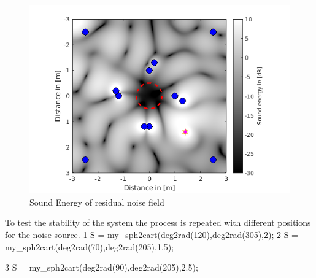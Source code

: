 \begin{figure}[H]
    \centerline{\includegraphics[width=\textwidth]{LaTeX/images/plots/ANC_1.png}}
    \caption{Sound Energy of residual noise field}
    \label{fig:ANC1}
\end{figure}

To test the stability of the system the process is repeated with different positions for the noise source.
1
S = my_sph2cart(deg2rad(120),deg2rad(305),2);
2
S = my_sph2cart(deg2rad(70),deg2rad(205),1.5);

3
S = my_sph2cart(deg2rad(90),deg2rad(205),2.5);
